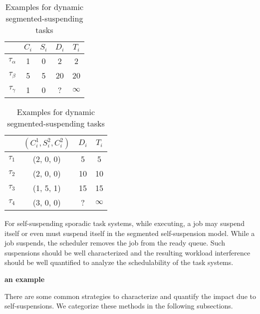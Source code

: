 \ifpaper
\begin{table}[t]
\else
\begin{table} 
\fi
\centering
    \begin{tabular}{|c|c|c|c|c|}
 \hline
        & $C_i$ &  $S_i$&  $D_i$ & $T_i$\\ 
        \hline
        $\tau_\alpha$ & 1 & 0 &  2 & 2\\ 
        $\tau_\beta$ &  5&  5& 20 & 20 \\ 
        $\tau_\gamma$ & 1 & 0  & ? & $\infty$ \\ 
        \hline
    \end{tabular} 
    \caption{Examples for dynamic self-suspending tasks}
    \label{table:dynamic-example}
\end{table}

\ifpaper
\begin{table}[t]
\else
\begin{table} 
\fi
\centering
    \begin{tabular}{|c|c|c|c|}
 \hline
        & $(C_i^1, S_i^2, C_i^2)$ &  $D_i$ & $T_i$\\ 
        \hline
        $\tau_1$ & (2, 0, 0) &  5 & 5\\ 
        $\tau_2$ &  (2, 0, 0) & 10 & 10 \\ 
        $\tau_3$ & (1, 5, 1) & 15  & 15\\
        $\tau_4$ & (3, 0, 0) & ? & $\infty$\\
        \hline
    \end{tabular} 
    \caption{Examples for dynamic segmented-suspending tasks}
    \label{table:static-example}
\end{table}

For self-suspending sporadic task systems, while executing, a job may suspend itself or even must suspend itself in the segmented self-suspension model. While a job suspends, the scheduler removes the job from the ready queue. Such suspensions should be well characterized and the resulting workload interference should be well quantified to analyze the schedulability of the task systems. 

{\bf an example}

There are some common strategies to characterize and quantify the impact due to self-suspensions. We categorize these methods in the following subsections.


\end{table}
\end{table}
